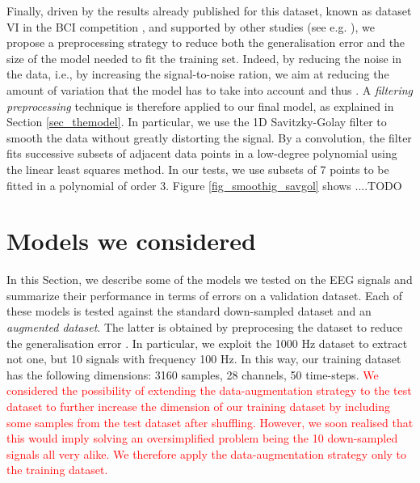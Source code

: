 \documentclass{article}
\begin{document}
Finally, driven by the results already published for this dataset, known as dataset VI in the BCI competition \cite{bci_ii}, and supported by other studies (see e.g. \cite{schirrmeister2017deep}), we propose a preprocessing strategy to reduce both the generalisation error and the size of the model needed to fit the training set.
Indeed, by reducing the noise in the data, i.e., by increasing the signal-to-noise ration, we aim at reducing the amount of variation that the model has to take into account \cite{goodfellow2016deep} and thus . 
A \emph{filtering preprocessing} technique is therefore applied to our  final model, as explained in Section \ref{sec_themodel}.
In particular, we use the 1D Savitzky-Golay filter \cite{savgol} to smooth the data without greatly distorting the signal. 
By a convolution, the filter fits successive subsets of adjacent data points in a low-degree polynomial using the linear least squares method. 
In our tests, we use subsets of 7 points to be fitted in a polynomial of order 3.
Figure \ref{fig_smoothig_savgol} shows ....TODO

 

 
 \section{Models we considered}\label{sec_allmodel}
 In this Section, we describe some of the models we tested on the EEG signals and summarize their performance in terms of errors on a validation dataset. Each of these models is tested against the standard down-sampled dataset and an \emph{augmented dataset}. The latter is obtained by preprocesing the dataset to reduce the generalisation error \cite{goodfellow2016deep}. In particular, we exploit the 1000 Hz dataset to extract not one, but 10  signals with frequency 100 Hz. 
In this way, our training dataset has the following dimensions: 3160 samples, 28 channels, 50 time-steps. 
\textcolor{red}{We considered the possibility of extending the data-augmentation strategy to the test dataset to further increase the dimension of our training dataset by including some samples from the test dataset after shuffling. 
However, we soon realised that this would imply solving an oversimplified problem being the 10 down-sampled signals all very alike. 
We therefore apply the data-augmentation strategy only to the training dataset.}
 
\end{document}
